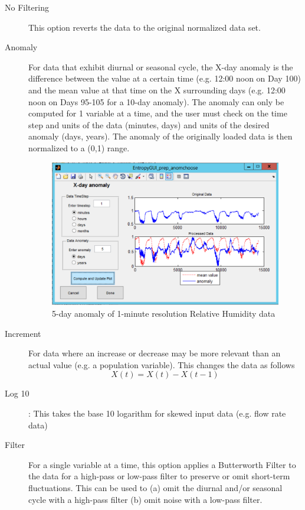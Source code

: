 \documentclass[a4paper]{article}
\begin{document}
\begin{description}
\item[No Filtering] This option reverts the data to the original normalized data set.

\item[Anomaly] For data that exhibit diurnal or seasonal cycle, the X-day anomaly is the difference between the value at a certain time (e.g. 12:00 noon on Day 100) and the mean value at that time on the X surrounding days (e.g. 12:00 noon on Days 95-105 for a 10-day anomaly). The anomaly can only be computed for 1 variable at a time, and the user must check on the time step and units of the data (minutes, days) and units of the desired anomaly (days, years).  The anomaly of the originally loaded data is then normalized to a (0,1) range.


\begin{figure}[h!]\label{fig:anom}
\begin{center}
\includegraphics[scale=.5]{Image_AnomalyRH.pdf}
\caption{5-day anomaly of 1-minute resolution Relative Humidity data}
\end{center}
\end{figure}

\item[Increment] For data where an increase or decrease may be more relevant than an actual value (e.g. a population variable).  This changes the data as follows
\begin{equation}
X(t) = X(t)-X(t-1)
\end{equation}


\item[Log 10]: This takes the base 10 logarithm for skewed input data (e.g. flow rate data)

\item[Filter] For a single variable at a time, this option applies a Butterworth Filter to the data for a high-pass or low-pass filter to preserve or omit short-term fluctuations.  This can be used to (a) omit the diurnal and/or seasonal cycle with a high-pass filter (b) omit noise with a low-pass filter.


\end{description}
\end{document}
